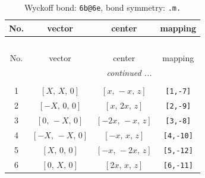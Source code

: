 \documentclass[fleqn,8pt]{jsarticle}
\begin{document}
\begin{longtable}{cccc}
\caption{Wyckoff bond: {\tt 6b@6e}, bond symmetry: {\tt .m.}}
 \\
 \hline \hline
No. & vector & center & mapping \\ \hline \endfirsthead

\multicolumn{3}{l}{\tablename\ \thetable{}} \\
 \hline \hline
No. & vector & center & mapping \\ \hline \endhead

 \hline \hline
\multicolumn{3}{r}{\footnotesize\it continued ...} \\ \endfoot

 \hline \hline
\multicolumn{3}{r}{} \\ \endlastfoot

1 & $\left[ X,\, X,\, 0 \right]$ & $\left[ x,\, - x,\, z \right]$ & {\tt [1,-7]} \\ \hline
2 & $\left[ - X,\, 0,\, 0 \right]$ & $\left[ x,\, 2 x,\, z \right]$ & {\tt [2,-9]} \\ \hline
3 & $\left[ 0,\, - X,\, 0 \right]$ & $\left[ - 2 x,\, - x,\, z \right]$ & {\tt [3,-8]} \\ \hline
4 & $\left[ - X,\, - X,\, 0 \right]$ & $\left[ - x,\, x,\, z \right]$ & {\tt [4,-10]} \\ \hline
5 & $\left[ X,\, 0,\, 0 \right]$ & $\left[ - x,\, - 2 x,\, z \right]$ & {\tt [5,-12]} \\ \hline
6 & $\left[ 0,\, X,\, 0 \right]$ & $\left[ 2 x,\, x,\, z \right]$ & {\tt [6,-11]} \\
\end{longtable}
\renewcommand{\arraystretch}{1.2}
\end{document}
